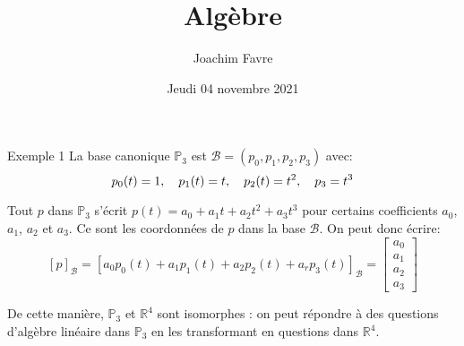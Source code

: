 \documentclass[a4paper]{article}
\title{Algèbre}
\author{Joachim Favre}
\date{Jeudi 04 novembre 2021}
\begin{document}
\maketitle


\begin{parag}{Exemple 1}
    La base canonique $\mathbb{P}_3$ est $\mathcal{B} = \left(p_0, p_1, p_2, p_3\right)$ avec:
    \[p_0\left(t\right) = 1, \mathspace p_1\left(t\right) = t, \mathspace p_2\left(t\right) = t^2, \mathspace p_3 = t^3\]

    Tout $p$ dans $\mathbb{P}_3$ s'écrit $p\left(t\right) = a_0 + a_1 t + a_2t^2 + a_3t^3$ pour certains coefficients $a_0$, $a_1$, $a_2$ et $a_3$. Ce sont les coordonnées de $p$ dans la base $\mathcal{B}$. On peut donc écrire:
    \[\left[p\right]_{\mathcal{B}} = \left[a_0 p_0\left(t\right) + a_1p_1\left(t\right) + a_2p_2\left(t\right) + a_rp_3\left(t\right)\right]_{\mathcal{B}} = \begin{bmatrix} a_0 \\ a_1 \\ a_2 \\ a_3 \end{bmatrix} \]

    De cette manière, $\mathbb{P}_3$ et $\mathbb{R}^{4}$ sont isomorphes : on peut répondre à des questions d'algèbre linéaire dans $\mathbb{P}_3$ en les transformant en questions dans $\mathbb{R}^4$.
\end{parag}
\end{document}
